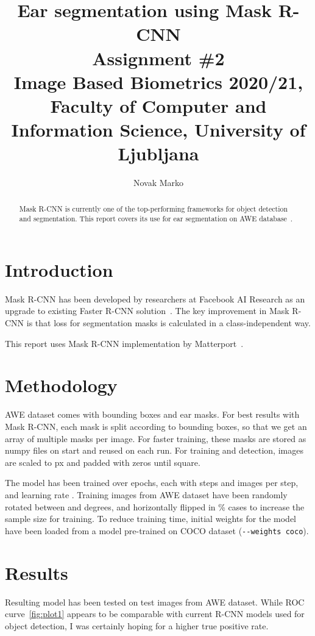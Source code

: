 \documentclass[9pt]{IEEEtran}
\title{\vspace{0ex} %
Ear segmentation using Mask R-CNN
\\ \large{Assignment \#2}\\ \normalsize{Image Based Biometrics 2020/21, Faculty of Computer and Information Science, University of Ljubljana}}
\author{ %
Novak Marko
\vspace{-4.0ex}
}
\begin{document}
\maketitle

\begin{abstract}
Mask R-CNN is currently one of the top-performing frameworks for object detection and segmentation. This report covers its use for ear segmentation on AWE database~\cite{DBLP:journals/corr/EmersicSP16}.
\end{abstract}

\section{Introduction}
Mask R-CNN has been developed by researchers at Facebook AI Research as an upgrade to existing Faster R-CNN solution~\cite{DBLP:journals/corr/HeGDG17}. The key improvement in Mask R-CNN is that loss for segmentation masks is calculated in a class-independent way.

This report uses Mask R-CNN implementation by Matterport~\cite{matterport_maskrcnn_2017}.

\section{Methodology}
AWE dataset comes with bounding boxes and ear masks. For best results with Mask R-CNN, each mask is split according to bounding boxes, so that we get an array of multiple masks per image. For faster training, these masks are stored as numpy files on start and reused on each run. For training and detection, images are scaled to px and padded with zeros until square.

The model has been trained over  epochs, each with  steps and  images per step, and learning rate . Training images from AWE dataset have been randomly rotated between  and  degrees, and horizontally flipped in \% cases to increase the sample size for training. To reduce training time, initial weights for the model have been loaded from a model pre-trained on COCO dataset (\texttt{-{}-weights coco}).

\section{Results}

Resulting model has been tested on test images from AWE dataset. While ROC curve~\ref{fig:plot1} appears to be comparable with current R-CNN models used for object detection, I was certainly hoping for a higher true positive rate.
\end{document}
